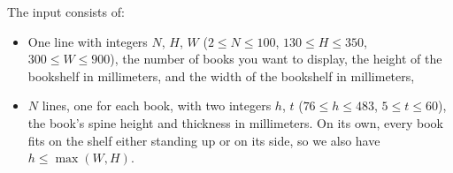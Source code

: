 
    The input consists of:
    \begin{itemize}
      \item One line with integers $N$, $H$, $W$ ($2\leq N\leq 100$, $130 \leq H\leq 350$, $300\leq W\leq 900$), 
	the number of books you want to display,
	the height of the bookshelf in millimeters, 
	and the width of the bookshelf in millimeters,
      \item $N$ lines, one for each book, with two integers $h$, $t$
	($76\leq h\leq 483$, $5\leq t\leq 60$), 
	the book's spine height and thickness in millimeters.
	On its own, every book fits on the shelf either standing up or on its side, so we also have $h\leq \max(W, H)$.
    \end{itemize}
